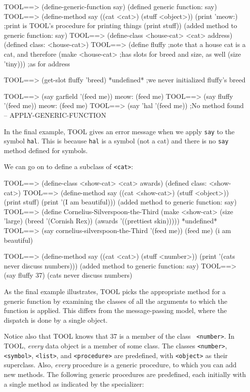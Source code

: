 \beginlisp
TOOL==> (define-generic-function say)
(defined generic function: say)
\null
TOOL==> (define-method say ((cat <cat>) (stuff <object>))
           (print 'meow:)  ;print is TOOL's procedure for printing things
           (print stuff))
(added method to generic function: say)
\null
TOOL==> (define-class <house-cat> <cat> address)
(defined class: <house-cat>)
TOOL==> (define fluffy         ;note that a house cat is a cat, and therefore
          (make <house-cat>    ;has slots for breed and size, as well
                (size 'tiny))) ;as for address
\endlisp

\beginlisp
TOOL==> (get-slot fluffy 'breed)
*undefined*                   ;we never initialized fluffy's breed
\endlisp

\beginlisp
TOOL==> (say garfield '(feed me))
meow:
(feed me)
TOOL==> (say fluffy '(feed me))
meow:
(feed me)
TOOL==> (say 'hal '(feed me))
;No method found -- APPLY-GENERIC-FUNCTION
\endlisp

\noindent In the final example, TOOL gives an error message when we
apply {\tt say} to the symbol {\tt hal}.  This is because {\tt hal}
is a symbol (not a cat) and there is no {\tt say} method defined for
symbols.

We can go on to define a subclass of {\tt <cat>}:

\beginlisp
TOOL==> (define-class <show-cat> <cat> awards)
(defined class: <show-cat>)
\null
TOOL==> (define-method say ((cat <show-cat>) (stuff <object>))
           (print stuff)
           (print '(I am beautiful)))
(added method to generic function: say)
\null
TOOL==> (define Cornelius-Silverspoon-the-Third
           (make <show-cat>
                 (size 'large)
                 (breed '(Cornish Rex))
                 (awards '((prettiest skin)))))
*undefined*
\null
TOOL==> (say cornelius-silverspoon-the-Third '(feed me))
(feed me)
(i am beautiful)
\endlisp

\beginlisp
TOOL==> (define-method say ((cat <cat>) (stuff <number>))
          (print '(cats never discuss numbers)))
(added method to generic function: say)
\null
TOOL==> (say fluffy 37)
(cats never discuss numbers)
\endlisp

As the final example illustrates, TOOL picks the appropriate method
for a generic function by examining the classes of all the arguments
to which the function is applied.  This differs from the
message-passing model, where the dispatch is done by a single object.

Notice also that TOOL knows that 37 is a member of the class {\tt
<number>}.  In TOOL, {\it every} data object is a member of some
class.  The classes {\tt <number>}, {\tt <symbol>}, {\tt <list>}, and
{\tt <procedure>} are predefined, with {\tt <object>} as their
superclass.  Also, {\it every} procedure is a generic procedure,
to which you can add new methods.  The following generic procedures
are predefined, each initially with a single method as indicated
by the specializer:

